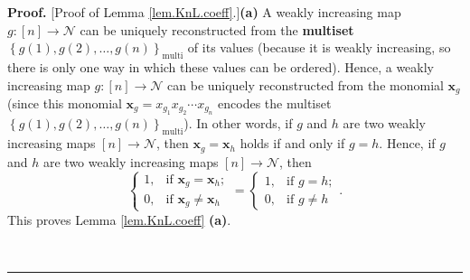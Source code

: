 \documentclass[numbers=enddot,12pt,final,onecolumn,notitlepage]{scrartcl}%
\theoremstyle{definition}
\newenvironment{proof}[1][Proof]{\noindent\textbf{#1.} }{\ \rule{0.5em}{0.5em}}
\begin{document}
\begin{proof}
[Proof of Lemma \ref{lem.KnL.coeff}.]\textbf{(a)} A weakly increasing map
$g:\left[  n\right]  \rightarrow\mathcal{N}$ can be uniquely reconstructed
from the \textbf{multiset} $\left\{  g\left(  1\right)  ,g\left(  2\right)
,\ldots,g\left(  n\right)  \right\}  _{\operatorname*{multi}}$ of its values
(because it is weakly increasing, so there is only one way in which these
values can be ordered). Hence, a weakly increasing map $g:\left[  n\right]
\rightarrow\mathcal{N}$ can be uniquely reconstructed from the monomial
$\mathbf{x}_{g}$ (since this monomial $\mathbf{x}_{g}=x_{g_{1}}x_{g_{2}}\cdots
x_{g_{n}}$ encodes the multiset $\left\{  g\left(  1\right)  ,g\left(
2\right)  ,\ldots,g\left(  n\right)  \right\}  _{\operatorname*{multi}}$). In
other words, if $g$ and $h$ are two weakly increasing maps $\left[  n\right]
\rightarrow\mathcal{N}$, then $\mathbf{x}_{g}=\mathbf{x}_{h}$ holds if and
only if $g=h$. Hence, if $g$ and $h$ are two weakly increasing maps $\left[
n\right]  \rightarrow\mathcal{N}$, then
\[%
\begin{cases}
1, & \text{if }\mathbf{x}_{g}=\mathbf{x}_{h};\\
0, & \text{if }\mathbf{x}_{g}\neq\mathbf{x}_{h}%
\end{cases}
=%
\begin{cases}
1, & \text{if }g=h;\\
0, & \text{if }g\neq h
\end{cases}
.
\]
This proves Lemma \ref{lem.KnL.coeff} \textbf{(a)}.


\end{proof}
\end{document}
